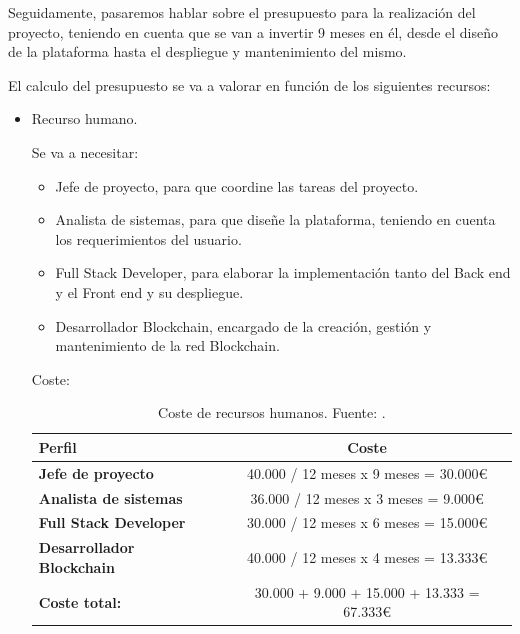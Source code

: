 Seguidamente, pasaremos hablar sobre el presupuesto para la realización del proyecto, teniendo en cuenta que se van a 
invertir 9 meses en él, desde el diseño de la plataforma hasta el despliegue y mantenimiento del mismo.

El calculo del presupuesto se va a valorar en función de los siguientes recursos:

\begin{itemize}
  \item Recurso humano.
  
  Se va a necesitar: 
  
  \begin{itemize}
    \item Jefe de proyecto, para que coordine las tareas del proyecto.
    \item Analista de sistemas, para que diseñe la plataforma, teniendo en cuenta los requerimientos del usuario.
    \item Full Stack Developer, para elaborar la implementación tanto del Back end y el Front end y su despliegue.
    \item Desarrollador Blockchain, encargado de la creación, gestión y mantenimiento de la red Blockchain.
  \end{itemize}

  Coste:

  \begin{table}[h!]
    \centering
    \begin{tabular}{|l|c|}
        \hline
        \textbf{Perfil}                     &   \textbf{Coste} \\
        \hline 
        \hline
        \textbf{Jefe de proyecto}           &   40.000 / 12 meses x 9 meses = 30.000€ \\ 
        \hline 
        \textbf{Analista de sistemas}       &   36.000 / 12 meses x 3 meses = 9.000€ \\ 
        \hline
        \textbf{Full Stack Developer}       &   30.000 / 12 meses x 6 meses = 15.000€ \\ 
        \hline
        \textbf{Desarrollador Blockchain}   &   40.000 / 12 meses x 4 meses = 13.333€ \\ 
        \hline
        \textbf{Coste total:}               &   30.000 + 9.000 + 15.000 + 13.333 = 67.333€ \\ 
        \hline
    \end{tabular}
    
    \caption{Coste de recursos humanos. Fuente: \cite{info-jobs}.}
    \label{table:coste-recurso-humanos}
  \end{table}



\end{itemize}
